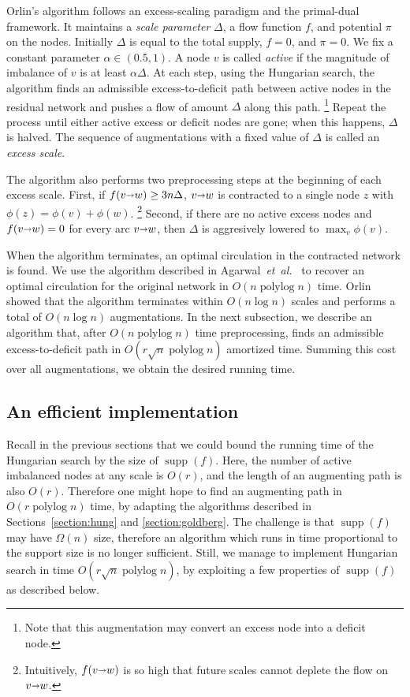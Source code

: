 \documentclass[11pt,twoside]{article}
\makeatletter
\def\etal{\emph{et~al.}}
\def\etal{\textit{et~al.}}
\def\polylog{\mathop{\mathrm{polylog}}}
\def\fsupply{\phi}
\def\arcto{\mathord\shortrightarrow}
\def\arc#1#2{#1\arcto#2}
\def\supp{\operatorname{supp}}
\theoremstyle{plain}
\numberwithin{figure}{section}
\def\EMPH#1{\textcolor{BrickRed}{{\emph{#1}}}}
\def\n@te#1{\textsf{\boldmath \textbf{$\langle\!\langle$#1$\rangle\!\rangle$}}\leavevmode}
\def\note#1{\textcolor{red}{\n@te{#1}}}
\makeatother
\begin{document}
Orlin's algorithm follows an excess-scaling paradigm and the primal-dual framework.
It maintains a \EMPH{scale parameter} $\Delta$, a flow function $f$, and
potential $\pi$ on the nodes.
Initially $\Delta$ is equal to the total supply, $f = 0$, and $\pi = 0$.
We fix a constant parameter $\alpha \in (0.5, 1)$.
A node $v$ is called \EMPH{active} if the magnitude of imbalance of $v$ is at least $\alpha\Delta$.
At each step, using the Hungarian search, the algorithm finds an admissible
excess-to-deficit path between active nodes in the residual network and pushes a flow
of amount $\Delta$ along this path.%
\footnote{Note that this augmentation may convert an excess node into a deficit node.}
Repeat the process until either active excess or deficit nodes are gone; when this happens, $\Delta$ is halved.
The sequence of augmentations with a fixed value of $\Delta$ is called an
\EMPH{excess scale}.

The algorithm also performs two preprocessing steps at the beginning of each excess scale.
First, if $f(\arc vw) \geq 3n\Delta$, $\arc vw$ is contracted to a single node $z$ with
$\fsupply(z) = \fsupply(v) + \fsupply(w)$.%
\footnote{Intuitively, $f(\arc vw)$ is so high that future scales cannot deplete
the flow on $\arc vw$.}
Second, if there are no active excess nodes and $f(\arc vw) = 0$ for every arc $\arc vw$, then $\Delta$
is aggresively lowered to $\max_v \fsupply(v)$.

When the algorithm terminates, an optimal circulation in the
contracted network is found.
We use the algorithm described in Agarwal~\etal~\cite{AFPVX17arxiv} to recover
an optimal circulation for the original network in $O(n\polylog n)$ time.
Orlin showed that the algorithm terminates within $O(n\log n)$ scales and
performs a total of $O(n\log n)$ augmentations.
In the next subsection, we describe an algorithm that, after $O(n\polylog n)$ time
preprocessing,
finds an admissible excess-to-deficit path
in $O(r\sqrt{n} \polylog n)$ amortized time.
Summing this cost over all augmentations, we obtain the desired running time.

\subsection{An efficient implementation}

Recall in the previous sections that we could bound the running time of the
Hungarian search by the size of $\supp(f)$.
Here, the number of active imbalanced nodes at any scale is $O(r)$, and the
length of an augmenting path is also $O(r)$.
Therefore one might hope to find an augmenting path in $O(r\polylog n)$ time,
by adapting the algorithms described in Sections~\ref{section:hung} and
\ref{section:goldberg}.
The challenge is that $\supp(f)$ may have $\Omega(n)$ size,
therefore an algorithm which runs in time proportional to the support size is no longer
sufficient.
Still, we manage to implement Hungarian search in time $O(r\sqrt{n}\polylog n)$,
by exploiting a few properties of $\supp(f)$ as described below.
\end{document}
